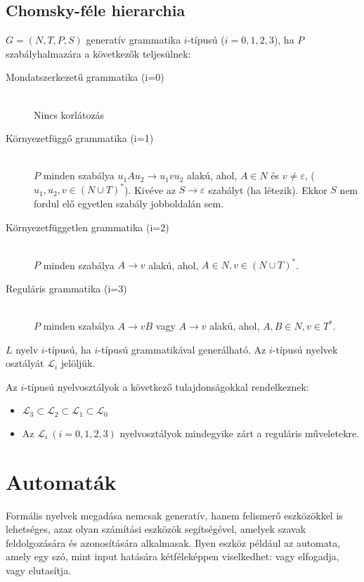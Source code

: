 \documentclass[margin=0px]{article}
\begin{document}
\subsection{Chomsky-féle hierarchia}
$G = (N,T,P,S)$ generatív grammatika $i$-típusú ($i=0,1,2,3$), ha $P$ szabályhalmazára a következők teljesülnek:
\begin{description}
    \item[Mondatszerkezetű grammatika (i=0)] \hfill \\
        Nincs korlátozás
    \item[Környezetfüggő grammatika (i=1)] \hfill \\
        $P$ minden szabálya $u_1Au_2 \rightarrow u_1vu_2$ alakú, ahol, $A\in N$ és $ v \neq \varepsilon $, ($u_1,u_2, v \in (N \cup T)^*$).
        Kivéve az $S \rightarrow \varepsilon$ szabályt (ha létezik). Ekkor $S$ nem fordul elő egyetlen szabály jobboldalán sem.
    \item[Környezetfüggetlen grammatika (i=2)] \hfill \\
        $P$ minden szabálya $A \rightarrow v$ alakú, ahol, $A\in N, v \in (N \cup T)^*$.
    \item[Reguláris grammatika (i=3)] \hfill \\
        $P$ minden szabálya $A \rightarrow vB$ vagy $A \rightarrow v$ alakú, ahol, $A,B\in N, v \in T^*$.
\end{description}

\noindent
$L$ nyelv $i$-típusú, ha $i$-típusú grammatikával generálható. Az $i$-típusú nyelvek osztályát $\mathcal{L}_i$ jelöljük.

\noindent
Az $i$-típusú nyelvosztályok a következő tulajdonságokkal rendelkeznek:
\begin{itemize}
    \item $ \mathcal{L}_3 \subset \mathcal{L}_2 \subset \mathcal{L}_1 \subset \mathcal{L}_0 $
    \item Az $\mathcal{L}_i \ (i=0,1,2,3)$ nyelvosztályok mindegyike zárt a reguláris műveletekre.
\end{itemize}
\section{Automaták}
Formális nyelvek megadása nemcsak generatív, hanem felismerő eszközökkel is lehetséges, azaz olyan számítási eszközök segítségével, amelyek szavak feldolgozására és azonosítására alkalmasak.
Ilyen eszköz például az automata, amely egy szó, mint input hatására kétféleképpen viselkedhet: vagy elfogadja, vagy elutasítja.
\end{document}
